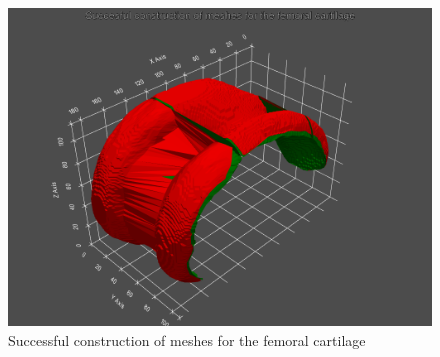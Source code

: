 \begin{figure}[htb!]
	\centering
	\includegraphics[width=\linewidth]{./figures/femoral_meshes}
	\caption{Successful construction of meshes for the femoral cartilage}
	\label{fig:femoral_meshes}
\end{figure}